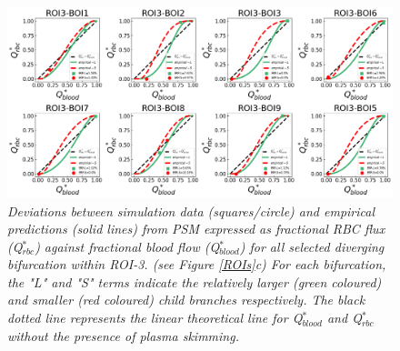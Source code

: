\uselandscape
\begin{figure}[H]
\centering
\includegraphics[width=1\textwidth]{images/DisproportionalityIndexQblood-ROI3.png}
\caption{\textit{Deviations between simulation data (squares/circle) and empirical predictions (solid lines) from PSM expressed as fractional RBC flux (Q$^{*}_{rbc}$) against fractional blood flow (Q$^{*}_{blood}$) for all selected diverging bifurcation within ROI-3. (see Figure \ref{ROIs}c) For each bifurcation, the "L" and "S" terms indicate the relatively larger (green coloured) and smaller (red coloured) child branches respectively. The black dotted line represents the linear theoretical line for Q$^{*}_{blood}$ and Q$^{*}_{rbc}$ without the presence of plasma skimming.} \label{DisproportionalityIndexQblood-ROI3}}
\end{figure}